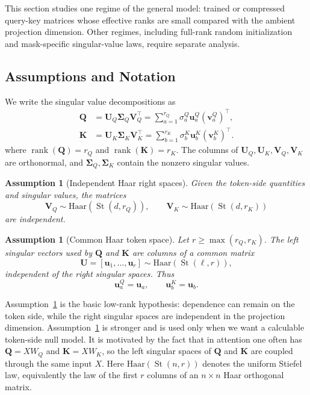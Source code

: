 \documentclass{article}
\newcommand{\rank}{\operatorname{rank}}
\newcommand{\St}{\operatorname{St}}
\newcommand{\bQ}{\mathbf{Q}}
\newcommand{\bK}{\mathbf{K}}
\newcommand{\bU}{\mathbf{U}}
\newcommand{\bV}{\mathbf{V}}
\newcommand{\bu}{\mathbf{u}}
\newcommand{\bv}{\mathbf{v}}
\newcommand{\bSigma}{\boldsymbol{\Sigma}}
\newtheorem{assumption}[theorem]{Assumption}
\theoremstyle{remark}
\begin{document}
This section studies one regime of the general model: trained or compressed
query-key matrices whose effective ranks are small compared with the ambient
projection dimension.  Other regimes, including full-rank random initialization
and mask-specific singular-value laws, require separate analysis.

\subsection{Assumptions and Notation}

We write the singular value decompositions as
\begin{equation}
    \begin{aligned}
    \bQ&=\bU_Q\bSigma_Q\bV_Q^\top
        =\sum_{a=1}^{r_Q}\sigma^Q_a\bu^Q_a(\bv^Q_a)^\top,\\
    \bK&=\bU_K\bSigma_K\bV_K^\top
        =\sum_{b=1}^{r_K}\sigma^K_b\bu^K_b(\bv^K_b)^\top .
    \end{aligned}
    \label{eq:svd}
\end{equation}
where $\rank(\bQ)=r_Q$ and $\rank(\bK)=r_K$.  The columns of
$\bU_Q,\bU_K,\bV_Q,\bV_K$ are orthonormal, and
$\bSigma_Q,\bSigma_K$ contain the nonzero singular values.

\begin{assumption}[Independent Haar right spaces]
Given the token-side quantities and singular values, the matrices
\[
        \bV_Q\sim \mathrm{Haar}(\St(d,r_Q)),
        \qquad
        \bV_K\sim \mathrm{Haar}(\St(d,r_K))
\]
are independent.
\label{ass:haar}
\end{assumption}

\begin{assumption}[Common Haar token space]
Let $r\geq \max(r_Q,r_K)$.  The left singular vectors used by $\bQ$ and $\bK$
are columns of a common matrix
\[
    \bU=[\bu_1,\ldots,\bu_r]\sim \mathrm{Haar}(\St(\ell,r)),
\]
independent of the right singular spaces.  Thus
\[
    \bu^Q_a=\bu_a,\qquad
    \bu^K_b=\bu_b.
\]
\label{ass:common-left-haar}
\end{assumption}

Assumption~\ref{ass:haar} is the basic low-rank hypothesis: dependence can
remain on the token side, while the right singular spaces are independent in the
projection dimension.  Assumption~\ref{ass:common-left-haar} is stronger and is
used only when we want a calculable token-side null model.  It is motivated by
the fact that in attention one often has $\bQ=XW_Q$ and $\bK=XW_K$, so the left
singular spaces of $\bQ$ and $\bK$ are coupled through the same input $X$.
Here $\mathrm{Haar}(\St(n,r))$ denotes the uniform Stiefel law, equivalently the
law of the first $r$ columns of an $n\times n$ Haar orthogonal matrix.
\end{document}
